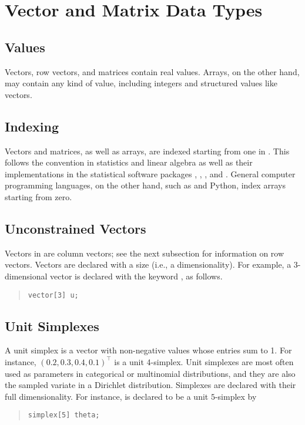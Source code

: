 \section{Vector and Matrix Data Types}

\subsection{Values}

Vectors, row vectors, and matrices contain real values.  Arrays, on
the other hand, may contain any kind of value, including integers and
structured values like vectors.


\subsection{Indexing}

Vectors and matrices, as well as arrays, are indexed starting from one
in \Stan.  This follows the convention in statistics and linear
algebra as well as their implementations in the statistical software
packages \R, \MATLAB, \BUGS, and \JAGS.  General computer programming
languages, on the other hand, such as \Cpp and Python, index arrays
starting from zero.


\subsection{Unconstrained Vectors}

Vectors in \Stan are column vectors; see the next subsection for
information on row vectors.  Vectors are declared with a size (i.e., a
dimensionality).  For example, a 3-dimensional vector is declared with
the keyword , as follows.
%
\begin{quote}
\begin{Verbatim}
vector[3] u;
\end{Verbatim}
\end{quote}
%

\subsection{Unit Simplexes}

A unit simplex is a vector with non-negative values whose entries sum
to 1.  For instance, $(0.2,0.3,0.4,0.1)^{\top}$ is a unit 4-simplex.
Unit simplexes are most often used as parameters in categorical
or multinomial distributions, and they are also the sampled variate in
a Dirichlet distribution.  Simplexes are declared with their full
dimensionality.  For instance,  is declared to
be a unit $5$-simplex by
%
\begin{quote}
\begin{Verbatim} 
simplex[5] theta;
\end{Verbatim}
\end{quote}
% 


